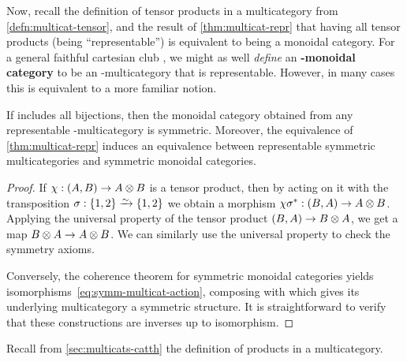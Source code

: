 Now, recall the definition of tensor products in a multicategory from \cref{defn:multicat-tensor}, and the result of \cref{thm:multicat-repr} that having all tensor products (being ``representable'') is equivalent to being a monoidal category.
For a general faithful cartesian club \fS, we might as well \emph{define} an \textbf{\fS-monoidal category} to be an \fS-multicategory that is representable.
However, in many cases this is equivalent to a more familiar notion.

\begin{thm}\label{thm:symm-multicat-repr}
  If \fS includes all bijections, then the monoidal category obtained from any representable \fS-multicategory is symmetric.
  Moreover, the equivalence of \cref{thm:multicat-repr} induces an equivalence between representable symmetric multicategories and symmetric monoidal categories.
\end{thm}
\begin{proof}
  If $\chi : (A,B) \to A\otimes B$ is a tensor product, then by acting on it with the transposition $\sigma : \{1,2\} \toiso \{1,2\}$ we obtain a morphism $\chi\sigma^* : (B,A) \to A\otimes B$.
  Applying the universal property of the tensor product $(B,A) \to B\otimes A$, we get a map $B\otimes A \to A\otimes B$.
  We can similarly use the universal property to check the symmetry axioms.

  Conversely, the coherence theorem for symmetric monoidal categories yields isomorphisms~\eqref{eq:symm-multicat-action}, composing with which gives its underlying multicategory a symmetric structure.
  It is straightforward to verify that these constructions are inverses up to isomorphism.
\end{proof}

Recall from \cref{sec:multicats-catth} the definition of products in a multicategory.


